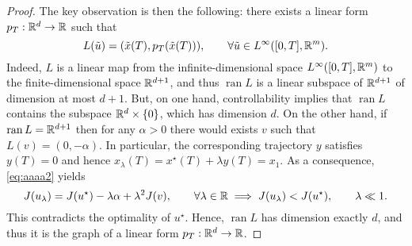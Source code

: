 \begin{proof}
    The key observation is then the following: there exists a linear form $p_T:\mathbb{R}^d\to \mathbb{R}$ such that 
    \begin{equation}
        \label{eq:L-der}
        L(\tilde u) = (\tilde x(T),p_T(\tilde x(T))), \qquad \forall \tilde u\in L^\infty([0,T],\mathbb{R}^m).
    \end{equation}
    Indeed, $L$ is a linear map from the infinite-dimensional space $L^\infty([0,T],\mathbb{R}^m)$ to the finite-dimensional space $\mathbb{R}^{d+1}$, and thus $\operatorname{ran} L$ is a linear subspace of $\mathbb{R}^{d+1}$ of dimension at most $d+1$. But, on one hand, controllability implies that $\operatorname{ran} L$ contains the subspace $\mathbb{R}^d\times \{0\}$, which has dimension $d$. On the other hand, if $\operatorname{ran} L = \mathbb{R}^{d+1}$ then for any $\alpha>0$ there would exists $v$ such that $L(v) = (0,-\alpha)$. 
    In particular, the corresponding trajectory $y$ satisfies $y(T)=0$ and hence $x_\lambda (T) = x^\star(T) +\lambda y(T) = x_1$. 
    As a consequence, \eqref{eq:aaaa2} yields 
    \begin{equation}
    J(u_\lambda) = J(u^\star)-\lambda \alpha+ \lambda^2 J(v), \qquad \forall \lambda\in\mathbb{R} 
    \implies J(u_\lambda) < J(u^\star), \qquad \lambda \ll 1.
    \end{equation} 
    This contradicts the optimality of $u^\star$. Hence, $\operatorname{ran} L$ has dimension exactly $d$, and thus it is the graph of a linear form $p_T:\mathbb{R}^d\to \mathbb{R}$.


\end{proof}
